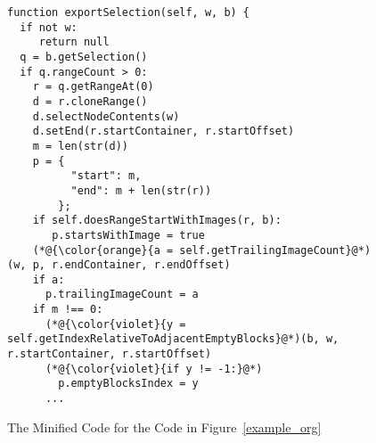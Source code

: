 \begin{figure}[t]
	\centering
	\begin{lstlisting}[]
function exportSelection(self, w, b) {
  if not w:
     return null
  q = b.getSelection()
  if q.rangeCount > 0:
    r = q.getRangeAt(0)
    d = r.cloneRange()
    d.selectNodeContents(w)
    d.setEnd(r.startContainer, r.startOffset)
    m = len(str(d))
    p = {
          "start": m,
          "end": m + len(str(r))
        };
    if self.doesRangeStartWithImages(r, b):
       p.startsWithImage = true
    (*@{\color{orange}{a = self.getTrailingImageCount}@*)(w, p, r.endContainer, r.endOffset)
    if a:
      p.trailingImageCount = a
    if m !== 0:
      (*@{\color{violet}{y = self.getIndexRelativeToAdjacentEmptyBlocks}@*)(b, w, r.startContainer, r.startOffset)
      (*@{\color{violet}{if y != -1:}@*)
        p.emptyBlocksIndex = y
      ...
\end{lstlisting}
\vspace{-12pt}
\caption{The Minified Code for the Code in Figure~\ref{example_org}}
\label{example_sim}
\end{figure}
